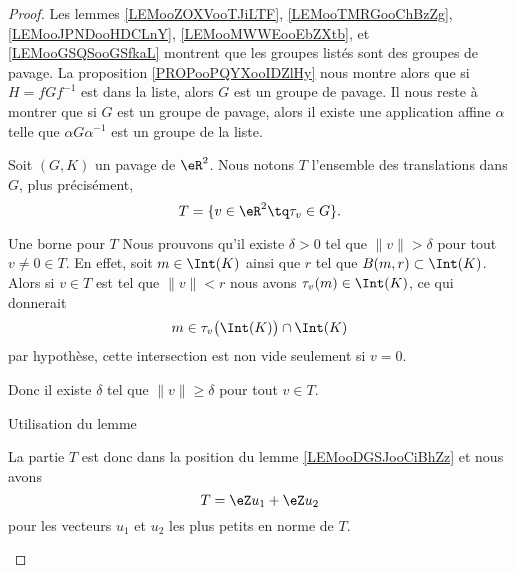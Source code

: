 \begin{proof}
    Les lemmes \ref{LEMooZOXVooTJiLTF},    \ref{LEMooTMRGooChBzZg},    \ref{LEMooJPNDooHDCLnY},    \ref{LEMooMWWEooEbZXtb}, et    \ref{LEMooGSQSooGSfkaL} montrent que les groupes listés sont des groupes de pavage. La proposition \ref{PROPooPQYXooIDZlHy} nous montre alors que si \( H=f Gf^{-1}\) est dans la liste, alors \( G\) est un groupe de pavage. Il nous reste à montrer que si \( G\) est un groupe de pavage, alors il existe une application affine \( \alpha\) telle que \( \alpha G\alpha^{-1}\) est un groupe de la liste.

    

    Soit \( (G,K)\) un pavage de \( \eR^2\).  Nous notons \( T\) l'ensemble des translations dans \( G\), plus précisément,
    \begin{equation}
        T=\{ v\in \eR^2\tq  \tau_v\in G\}.
    \end{equation}
    \begin{subproof}
        \item[Une borne pour \( T\)]
            Nous prouvons qu'il existe \( \delta>0\) tel que \( \| v \|>\delta\) pour tout \( v\neq 0\in T\). En effet, soit \( m\in \Int(K)\) ainsi que \( r\) tel que \( B(m,r)\subset \Int(K)\). Alors si \( v\in T\) est tel que \( \| v \|<r\) nous avons \( \tau_v(m)\in \Int(K)\), ce qui donnerait
            \begin{equation}
                m\in\tau_v\big( \Int(K) \big)\cap\Int(K)
            \end{equation}
            par hypothèse, cette intersection est non vide seulement si \( v=0\).

            Donc il existe \( \delta\) tel que \( \| v \|\geq \delta\) pour tout \( v\in T\).
        \item[Utilisation du lemme]

            La partie \( T\) est donc dans la position du lemme \ref{LEMooDGSJooCiBhZz} et nous avons
            \begin{equation}
                T=\eZ u_1+\eZ u_2
            \end{equation}
            pour les vecteurs \( u_1\) et \( u_2\) les plus petits en norme de \( T\).


\end{subproof}
\end{proof}
